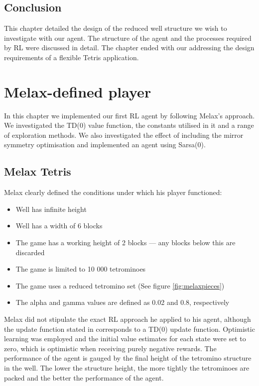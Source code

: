 \documentclass{rucsthesis}
\begin{document}
\section{Conclusion}

This chapter detailed the design of the reduced well structure we wish to investigate with our agent. The structure of the agent and the processes required by RL were discussed in detail. The chapter ended with our addressing the design requirements of a flexible Tetris application. 

\chapter{Melax-defined player}

In this chapter we implemented our first RL agent by following Melax's approach. We investigated the TD(0) value function, the constants utilised in it and a range of exploration methods. We also investigated the effect of including the mirror symmetry optimisation and implemented an agent using Sarsa(0).

\section{Melax Tetris \label{melaxchapt}}

Melax clearly defined the conditions under which his player functioned:

\begin{itemize}
\item{Well has infinite height}
\item{Well has a width of 6 blocks}
\item{The game has a working height of 2 blocks --- any blocks below this are discarded}
\item{The game is limited to 10 000 tetrominoes}
\item{The game uses a reduced tetromino set (See figure \ref{fig:melaxpieces})}
\item{The alpha and gamma values are defined as 0.02 and 0.8, respectively}
\end{itemize}

Melax did not stipulate the exact RL approach he applied to his agent, although the update function stated in \cite{melaxtetris} corresponds to a TD(0) update function. Optimistic learning was employed and the initial value estimates for each state were set to zero, which is optimistic when receiving purely negative rewards. The performance of the agent is gauged by the final height of the tetromino structure in the well. The lower the structure height, the more tightly the tetrominoes are packed and the better the performance of the agent.
\end{document}
